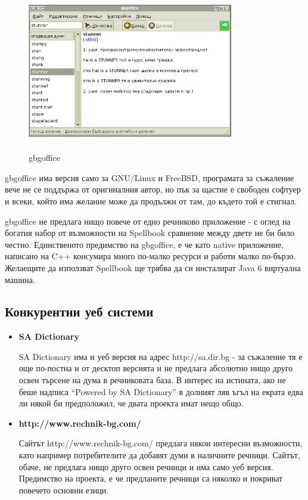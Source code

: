 \begin{itemize}
    \begin{figure}[htbp]
      \caption{gbgoffice}
      \centering
      \includegraphics[width=90mm, height=70mm]{images/gbgoffice.jpg}
    \end{figure}

    gbgoffice има версия само за GNU/Linux и FreeBSD, програмата за
    съжаление вече не се поддържа от оригиналния автор, но пък за
    щастие е свободен софтуер и всеки, който има желание може да
    продължи от там, до където той е стигнал.

    gbgoffice не предлага нищо повече от едно речниково приложение - с
    оглед на богатия набор от възможности на Spellbook сравнение между
    двете не би било честно. Единственото предимство на gbgoffice, е
    че като native приложение, написано на C++ консумира много
    по-малко ресурси и работи малко по-бързо. Желаещите да използват
    Spellbook ще трябва да си инсталират Java 6 виртуална машина.
\end{itemize}
\subsection{Конкурентни уеб системи}

\begin{itemize}
  \item \textbf{SA Dictionary}

    SA Dictionary има и уеб версия на адрес http://sa.dir.bg - за
    съжаление тя е още по-постна и от десктоп версията и не предлага
    абсолютно нищо друго освен търсене на дума в речниковата база. В
    интерес на истината, ако не беше надписа "`Powered by SA
    Dictionary"' в долният ляв ъгъл на екрата едва ли някой би
    предположил, че двата проекта имат нещо общо.

  \item \textbf{http://www.rechnik-bg.com/}

    Сайтът http://www.rechnik-bg.com/ предлага някои интересни
    възможности, като например потребителите да добавят думи в
    наличните речници. Сайтът, обаче, не предлага нищо друго освен
    речници и има само уеб версия. Предимство на проекта, е че
    предланите речници са няколко и покриват повечето основни езици.
\end{itemize}

